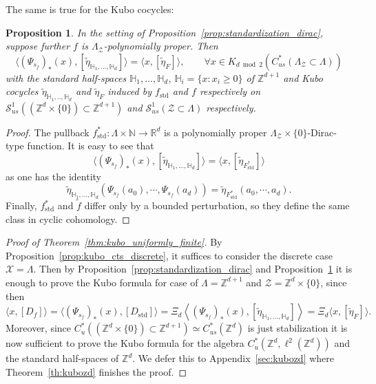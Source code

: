 \documentclass[12pt]{amsart}
\newtheorem{proposition}[theorem]{Proposition}
\newcommand{\NM}{{\mathbb N}}
\newcommand{\RM}{{\mathbb R}}
\newcommand{\ZM}{{\mathbb Z}}
\newcommand{\Ss}{{\mathcal S}}
\newcommand{\Xx}{{\mathcal X}}
\newcommand{\Zz}{{\mathcal Z}}
\begin{document}
The same is true for the Kubo cocycles:
\begin{proposition}
\label{prop:standardization_cocycle}
In the setting of Proposition~\ref{prop:standardization_dirac}, suppose further $f$ is $\Lambda_\Zz$-polynomially proper. 
Then
$$\langle (\Psi_{s_f})_*(x), [\tilde{\eta}_{\mathbb{H}_1,\dots,\mathbb{H}_d}] \rangle = \langle x,[\tilde{\eta}_{F}]\rangle, \qquad \forall x\in K_{d\bmod 2}(C^*_{us}(\Lambda_{\Zz}\subset \Lambda))$$
with the standard half-spaces $\mathbb{H}_1,\dots,\mathbb{H}_d$, $\mathbb{H}_i=\{x: x_i\geq 0\}$ of $\ZM^{d+1}$ and Kubo cocycles $\tilde{\eta}_{\mathbb{H}_1,..,\mathbb{H}_d}$ and $\tilde{\eta}_{F}$ induced by $f_{\mathrm{std}}$ and $f$ respectively on $\Ss^1_{us}((\ZM^d\times \{0\})\subset \ZM^{d+1})$ and $\Ss^1_{us}(\Zz\subset \Lambda)$ respectively. 

\end{proposition}
\begin{proof}
The pullback $f^*_{\mathrm{std}}: \Lambda\times \NM\to \RM^d$ is a polynomially proper $\Lambda_{\Zz}\times \{0\}$-Dirac-type function. It is easy to see that
$$\langle (\Psi_{s_f})_*(x), [\tilde{\eta}_{\mathbb{H}_1,\dots,\mathbb{H}_d}] \rangle = \langle x, [\tilde{\eta}_{F_{\mathrm{std}}^*}] \rangle$$
as one has the identity
$$\tilde{\eta}_{\mathbb{H}_1,\dots,\mathbb{H}_d}(\Psi_{s_f}(a_0),\cdots,\Psi_{s_f}(a_d))= \tilde{\eta}_{F_{\mathrm{std}}^*}(a_0,\cdots,a_d).$$
Finally, $f^*_{\mathrm{std}}$ and $\tilde{f}$ differ only by a bounded perturbation, so they define the same class in cyclic cohomology.
\end{proof}


\begin{proof}[Proof of Theorem~\ref{thm:kubo_uniformly_finite}]
By Proposition~\ref{prop:kubo_cts_discrete}, it suffices to consider the discrete case $\Xx=\Lambda$.
Then by Proposition~\ref{prop:standardization_dirac} and Proposition~\ref{prop:standardization_cocycle} it is enough to prove the Kubo formula for case of $\Lambda=\ZM^{d+1}$ and $\Zz=\ZM^{d}\times \{0\}$, since then
\[
\langle x,[D_f]\rangle=
\langle(\Psi_{s_f})_*(x),[D_{\mathrm{std}}]\rangle=
\Xi_d\left\langle (\Psi_{s_f})_*(x),[\widetilde\eta_{\mathbb H_1,\ldots,\mathbb H_d}]\right\rangle=
\Xi_d\langle x,[\widetilde\eta_F]\rangle.
\] Moreover, since $C^*_{u}((\ZM^{d}\times \{0\})\subset \ZM^{d+1})\simeq C^*_{us}(\ZM^{d})$ is just stabilization  it is now sufficient to prove the Kubo formula for the algebra $C^*_u(\ZM^d, \ell^2(\ZM^d))$ and the standard half-spaces of $\ZM^d$. We defer this to Appendix~\ref{sec:kubozd} where Theorem~\ref{th:kubozd} finishes the proof.
\end{proof}
\end{document}
